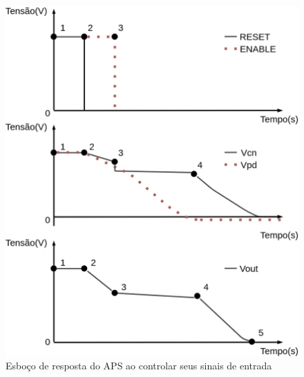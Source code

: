 \begin{figure}[!h]
	\caption{\label{figura_estagiosAPS}Esboço de resposta do APS ao controlar seus sinais de entrada}
	\begin{center}
	    \includegraphics[scale=0.2]{Imagens/estagiosAPS.png}
	\end{center}
\end{figure}

